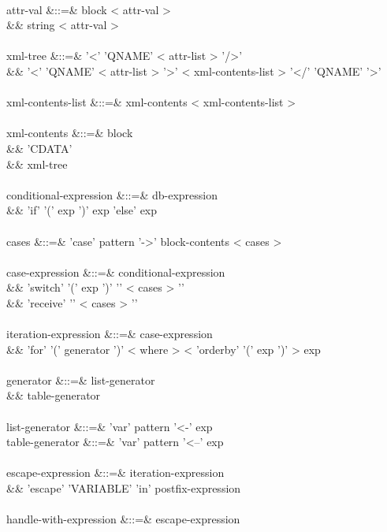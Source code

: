\documentclass[11pt,a4paper]{article}
\begin{document}
\begin{grammar}
\\
attr-val &::=& block < attr-val > \\
&&             string < attr-val >  \\
\\
xml-tree &::=& '<' 'QNAME' < attr-list > '/>' \\
&&             '<' 'QNAME' < attr-list > '>' < xml-contents-list > '</' 'QNAME' '>' \\
\\
xml-contents-list &::=& xml-contents < xml-contents-list > \\
\\
xml-contents &::=& block \\
&&                 'CDATA' \\
&&                 xml-tree \\
\\
conditional-expression &::=& db-expression \\
&&                           'if' '(' exp ')' exp 'else' exp \\
\\
cases &::=& 'case' pattern '->' block-contents < cases >  \\
\\
case-expression &::=&  conditional-expression \\
&&                     'switch' '(' exp ')' '{' < cases > '}' \\
&&                     'receive' '{' < cases > '}' \\
\\
iteration-expression &::=& case-expression \\
&&                         'for' '(' generator ')' < where > < 'orderby' '(' exp ')' > exp \\
\\
generator &::=&  list-generator \\
&&               table-generator \\
\\
list-generator  &::=& 'var' pattern '<-' exp \\
table-generator &::=& 'var' pattern '<--' exp \\
\\
escape-expression &::=& iteration-expression \\
&&                      'escape' 'VARIABLE' 'in' postfix-expression \\
\\
handle-with-expression &::=& escape-expression \\

\end{grammar}
\end{document}
